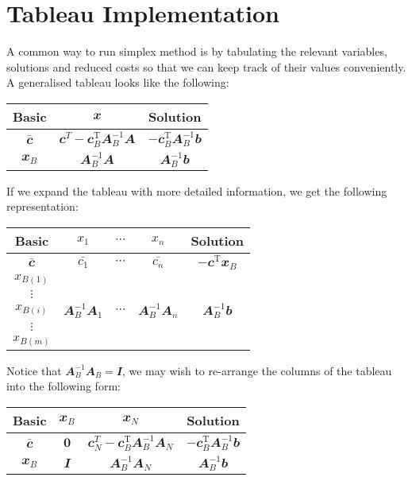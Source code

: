 \documentclass[math, code]{amznotes}
\theoremstyle{remark}
\begin{document}
\section{Tableau Implementation}
A common way to run simplex method is by tabulating the relevant variables, solutions and reduced costs so that we can keep track of their values conveniently. A generalised tableau looks like the following:
\begin{center}
    \begin{tabular}{|c|c|c|}
        \hline
        Basic & $\mathbfit{x}$ & Solution \\
        \hline
        $\mathbfit{\bar{c}}$ & $\mathbfit{c}^{T} - \mathbfit{c}_B^{\mathrm{T}}\mathbfit{A}_B^{-1}\mathbfit{A}$ & $-\mathbfit{c}_B^{\mathrm{T}}\mathbfit{A}_B^{-1}\mathbfit{b}$ \\
        \hline
        $\mathbfit{x}_B$ & $\mathbfit{A}_B^{-1}\mathbfit{A}$ & $\mathbfit{A}_B^{-1}\mathbfit{b}$ \\
        \hline
    \end{tabular}
\end{center}
If we expand the tableau with more detailed information, we get the following representation:
\begin{center}
    \begin{tabular}{|c|ccc|c|}
        \hline
        Basic & $x_1$ & $\cdots$ & $x_n$ & Solution \\
        \hline
        $\mathbfit{\bar{c}}$ & $\bar{c_1}$ & $\cdots$ & $\bar{c_n}$ & $-\mathbfit{c}^{\mathrm{T}}\mathbfit{x}_B$ \\
        \hline
        $x_{B(1)}$ & & & & \\
        $\vdots$ & & & & \\
        $x_{B(i)}$ & $\mathbfit{A}_B^{-1}\mathbfit{A}_1$ & $\cdots$ & $\mathbfit{A}_B^{-1}\mathbfit{A}_n$ & $\mathbfit{A}_B^{-1}\mathbfit{b}$ \\
        $\vdots$ & & & & \\
        $x_{B(m)}$ & & & & \\
        \hline
    \end{tabular}
\end{center}
Notice that $\mathbfit{A}_B^{-1}\mathbfit{A}_B = \mathbfit{I}$, we may wish to re-arrange the columns of the tableau into the following form:
\begin{center}
    \begin{tabular}{|c|cc|c|}
        \hline
        Basic & $\mathbfit{x}_B$ & $\mathbfit{x}_N$ & Solution \\
        \hline
        $\mathbfit{\bar{c}}$ & $\mathbf{0}$ & $\mathbfit{c}_N^{T} - \mathbfit{c}_B^{\mathrm{T}}\mathbfit{A}_B^{-1}\mathbfit{A}_N$ & $-\mathbfit{c}_B^{\mathrm{T}}\mathbfit{A}_B^{-1}\mathbfit{b}$ \\
        \hline
        $\mathbfit{x}_B$ & $\mathbfit{I}$ & $\mathbfit{A}_B^{-1}\mathbfit{A}_N$ & $\mathbfit{A}_B^{-1}\mathbfit{b}$ \\
        \hline
    \end{tabular}
\end{center}
\end{document}
